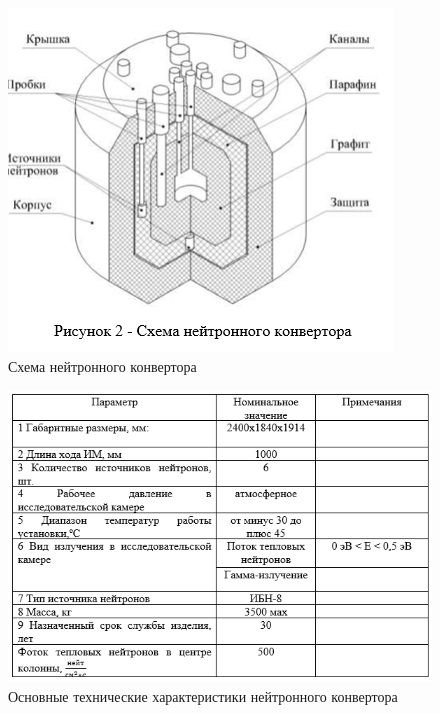 \documentclass[11pt]{article}
\begin{document}
\begin{figure}[!htpb]
\centering
\includegraphics[scale=0.7]{ris_2}
\caption{Схема нейтронного конвертора ~\cite{andreev}}
\label{}
\end{figure}

\begin{figure}[!htpb]
\centering
\includegraphics[scale=0.7]{tabl_1}
\caption{Основные технические характеристики нейтронного конвертора ~\cite{andreev_2}}
\label{}
\end{figure}
\end{document}
